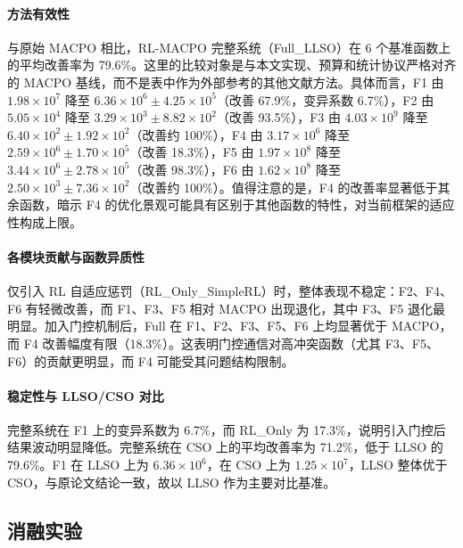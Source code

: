 \documentclass[conference]{IEEEtran}
\begin{document}
\paragraph{方法有效性} 与原始 MACPO 相比，RL-MACPO 完整系统（Full\_LLSO）在 6 个基准函数上的平均改善率为 79.6\%。这里的比较对象是与本文实现、预算和统计协议严格对齐的 MACPO 基线，而不是表中作为外部参考的其他文献方法。具体而言，F1 由 \(1.98 \times 10^7\) 降至 \(6.36 \times 10^6 \pm 4.25 \times 10^5\)（改善 67.9\%，变异系数 6.7\%），F2 由 \(5.05 \times 10^4\) 降至 \(3.29 \times 10^3 \pm 8.82 \times 10^2\)（改善 93.5\%），F3 由 \(4.03 \times 10^{9}\) 降至 \(6.40 \times 10^2 \pm 1.92 \times 10^2\)（改善约 100\%），F4 由 \(3.17 \times 10^6\) 降至 \(2.59 \times 10^6 \pm 1.70 \times 10^5\)（改善 18.3\%），F5 由 \(1.97 \times 10^8\) 降至 \(3.44 \times 10^6 \pm 2.78 \times 10^5\)（改善 98.3\%），F6 由 \(1.62 \times 10^8\) 降至 \(2.50 \times 10^3 \pm 7.36 \times 10^2\)（改善约 100\%）。值得注意的是，F4 的改善率显著低于其余函数，暗示 F4 的优化景观可能具有区别于其他函数的特性，对当前框架的适应性构成上限。

\paragraph{各模块贡献与函数异质性} 仅引入 RL 自适应惩罚（RL\_Only\_SimpleRL）时，整体表现不稳定：F2、F4、F6 有轻微改善，而 F1、F3、F5 相对 MACPO 出现退化，其中 F3、F5 退化最明显。加入门控机制后，Full 在 F1、F2、F3、F5、F6 上均显著优于 MACPO，而 F4 改善幅度有限（18.3\%）。这表明门控通信对高冲突函数（尤其 F3、F5、F6）的贡献更明显，而 F4 可能受其问题结构限制。

\paragraph{稳定性与 LLSO/CSO 对比} 完整系统在 F1 上的变异系数为 6.7\%，而 RL\_Only 为 17.3\%，说明引入门控后结果波动明显降低。完整系统在 CSO 上的平均改善率为 71.2\%，低于 LLSO 的 79.6\%。F1 在 LLSO 上为 \(6.36 \times 10^6\)，在 CSO 上为 \(1.25 \times 10^7\)，LLSO 整体优于 CSO，与原论文结论一致，故以 LLSO 作为主要对比基准。



\subsection{消融实验}
\end{document}

